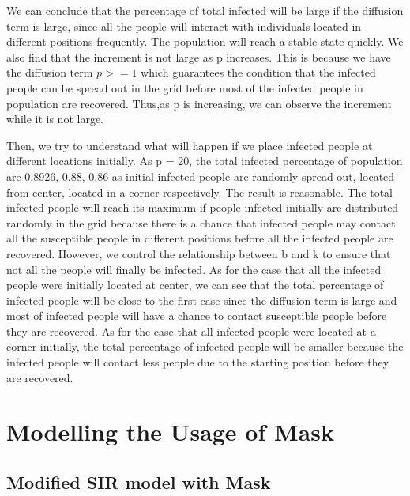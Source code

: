 \documentclass{article}
\begin{document}
 We can conclude that the percentage of total infected will be large if the diffusion term is large, since all the people will interact with individuals located in different positions frequently. The population will reach a stable state quickly. We also find that the increment is not large as p increases. This is because we have the diffusion term $p > =1$ which guarantees the condition that the infected people can be spread out in the grid before most of the infected people in population are recovered. Thus,as p is increasing, we can observe the increment while it is not large. 
 
 

Then, we try to understand what will happen if we place infected people at different locations initially. As p = 20, the total infected percentage of population are 0.8926, 0.88, 0.86 as initial infected people are randomly spread out, located from center, located in a corner respectively. The result is reasonable. The total infected people will reach its maximum if people infected initially are distributed randomly in the grid because there is a chance that infected people may contact all the susceptible people in different positions before all the infected people are recovered. However, we control the relationship between b and k to ensure that not all the people will finally be infected. As for the case that all the infected people were initially located at center, we can see that the total percentage of infected people will be close to the first case since the diffusion term is large and most of infected people will have a chance to contact susceptible people before they are recovered. As for the case that all infected people were located at a corner initially, the total percentage of infected people will be smaller because the infected people will contact less people due to the starting position before they are recovered. 



 \section{Modelling the Usage of Mask}
 
 \subsection{Modified SIR model with Mask}
 
\end{document}
